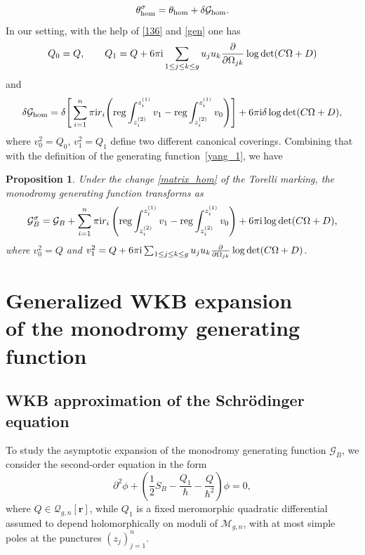 \documentclass[pdftex]{sigma}
\numberwithin{equation}{section}
\newtheorem{Proposition}[Theorem]{Proposition}
\theoremstyle{definition}
\begin{document}
\begin{equation*}\theta^{\sigma}_{{\rm hom}}=\theta_{{\rm hom}}+\delta\mathcal{G}_{{\rm hom}}. \end{equation*}
In our setting, with the help of \eqref{136} and \eqref{gen} one has
\begin{equation*}%
Q_0=Q, \qquad Q_1=Q+6 \pi {\rm i} \sum_{1 \leq j \leq k \leq g}u_j u_k \frac{\partial}{\partial \Omega_{jk}}\log \det (C \Omega +D)
\end{equation*}
and
\begin{equation*}\delta\mathcal{G}_{{\rm hom}}=\delta\Bigg[\sum^n_{i=1}\pi {\rm i} r_i\Bigg({\rm reg}\int^{z^{(1)}_i}_{z^{(2)}_i}v_1 -{\rm reg}\int^{z^{(1)}_i}_{z^{(2)}_i}v_0 \Bigg)\Bigg] +6 \pi {\rm i} \delta \log \det (C \Omega +D),
\end{equation*}
where $v_0^2=Q_0$, $v_1^2=Q_1 $ define two different canonical coverings.
Combining that with the definition of the generating function~\eqref{yang_1}, we have

\begin{Proposition}
Under the change \eqref{matrix_hom} of the Torelli marking, the monodromy generating function transforms as
\begin{equation*}
\mathcal{G}^{\sigma}_B=\mathcal{G}_B+\sum^n_{i=1}\pi {\rm i} r_i\left({\rm reg}\int^{z^{(1)}_i}_{z^{(2)}_i}v_1 -{\rm reg}\int^{z^{(1)}_i}_{z^{(2)}_i}v_0 \right) +6 \pi {\rm i} \log \det (C \Omega +D),
\end{equation*}
where $v_0^2=Q$ and $v_1^2=Q+6 \pi {\rm i} \sum_{1 \leq j \leq k \leq g}u_j u_k \frac{\partial}{\partial \Omega_{jk}}\log \det (C \Omega +D)$.
\end{Proposition}

\section[Generalized WKB expansion of the monodromy generating function]{Generalized WKB expansion\\ of the monodromy generating function}\label{section4}

\subsection{WKB approximation of the Schr\"odinger equation}\label{section4.1}
To study the asymptotic expansion of the monodromy generating function $\mathcal{G}_B$, we consider the second-order equation in the form
\begin{equation}\label{140}
\partial^2\phi+\left(\frac{1}{2}S_B-\frac{Q_1}{\hbar}-\frac{Q}{\hbar^2}\right)\phi=0,
\end{equation}
where $Q \in \mathcal{Q}_{g,n}[\mathbf{r}]$, while $Q_1$ is a fixed meromorphic quadratic differential assumed to depend holomorphically on moduli of $\mathcal{M}_{g,n}$, with at most simple poles at the punctures $(z_j)^n_{j=1}$.
\end{document}
